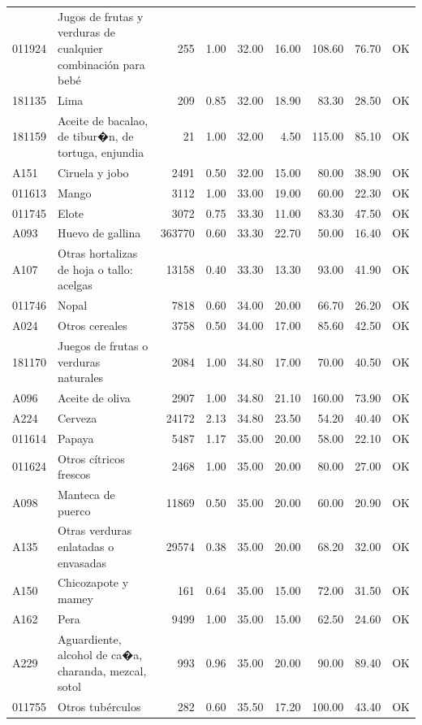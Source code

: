 \begin{table}[ht]
\begin{tabular}{llrrrrrrl}
  011924 & Jugos de frutas y verduras de cualquier combinación para bebé & 255 & 1.00 & 32.00 & 16.00 & 108.60 & 76.70 & OK \\ 
  181135 & Lima & 209 & 0.85 & 32.00 & 18.90 & 83.30 & 28.50 & OK \\ 
  181159 & Aceite de bacalao, de tibur�n, de tortuga, enjundia &  21 & 1.00 & 32.00 & 4.50 & 115.00 & 85.10 & OK \\ 
  A151 & Ciruela y jobo & 2491 & 0.50 & 32.00 & 15.00 & 80.00 & 38.90 & OK \\ 
  011613 & Mango & 3112 & 1.00 & 33.00 & 19.00 & 60.00 & 22.30 & OK \\ 
  011745 & Elote & 3072 & 0.75 & 33.30 & 11.00 & 83.30 & 47.50 & OK \\ 
  A093 & Huevo de gallina & 363770 & 0.60 & 33.30 & 22.70 & 50.00 & 16.40 & OK \\ 
  A107 & Otras hortalizas de hoja o tallo: acelgas & 13158 & 0.40 & 33.30 & 13.30 & 93.00 & 41.90 & OK \\ 
  011746 & Nopal & 7818 & 0.60 & 34.00 & 20.00 & 66.70 & 26.20 & OK \\ 
  A024 & Otros cereales & 3758 & 0.50 & 34.00 & 17.00 & 85.60 & 42.50 & OK \\ 
  181170 & Juegos de frutas o verduras naturales & 2084 & 1.00 & 34.80 & 17.00 & 70.00 & 40.50 & OK \\ 
  A096 & Aceite de oliva & 2907 & 1.00 & 34.80 & 21.10 & 160.00 & 73.90 & OK \\ 
  A224 & Cerveza & 24172 & 2.13 & 34.80 & 23.50 & 54.20 & 40.40 & OK \\ 
  011614 & Papaya & 5487 & 1.17 & 35.00 & 20.00 & 58.00 & 22.10 & OK \\ 
  011624 & Otros cítricos frescos & 2468 & 1.00 & 35.00 & 20.00 & 80.00 & 27.00 & OK \\ 
  A098 & Manteca de puerco & 11869 & 0.50 & 35.00 & 20.00 & 60.00 & 20.90 & OK \\ 
  A135 & Otras verduras enlatadas o envasadas & 29574 & 0.38 & 35.00 & 20.00 & 68.20 & 32.00 & OK \\ 
  A150 & Chicozapote y mamey & 161 & 0.64 & 35.00 & 15.00 & 72.00 & 31.50 & OK \\ 
  A162 & Pera & 9499 & 1.00 & 35.00 & 15.00 & 62.50 & 24.60 & OK \\ 
  A229 & Aguardiente, alcohol de ca�a, charanda, mezcal, sotol & 993 & 0.96 & 35.00 & 20.00 & 90.00 & 89.40 & OK \\ 
  011755 & Otros tubérculos & 282 & 0.60 & 35.50 & 17.20 & 100.00 & 43.40 & OK \\ 

\end{tabular}
\end{table}
